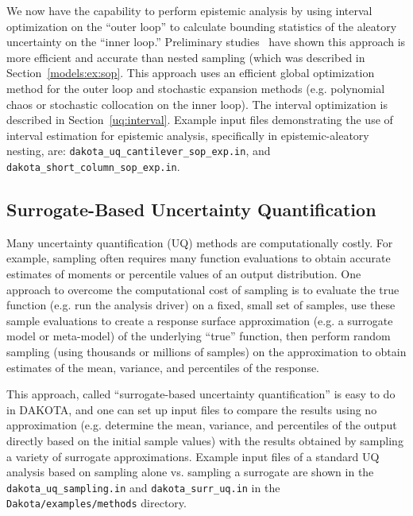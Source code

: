 We now have the capability to perform epistemic analysis by 
using interval optimization on the ``outer loop'' to calculate bounding 
statistics of the aleatory uncertainty on the ``inner loop.''  
Preliminary studies~\cite{Eldred09} have shown this approach is more efficient 
and accurate than nested sampling (which was described in 
Section~\ref{models:ex:sop}.  This approach uses 
an efficient global optimization method for the outer loop and 
stochastic expansion methods (e.g. polynomial chaos or stochastic 
collocation on the inner loop).  The interval optimization is described in 
Section~\ref{uq:interval}.  Example input files demonstrating 
the use of interval estimation for epistemic analysis, 
specifically in epistemic-aleatory nesting, are: 
\texttt{dakota\_uq\_cantilever\_sop\_exp.in}, and
\texttt{dakota\_short\_column\_sop\_exp.in}. 

\subsection{Surrogate-Based Uncertainty Quantification} \label{models:ex:sbuq}

Many uncertainty quantification (UQ) methods are computationally costly. 
For example, sampling often requires many function evaluations to obtain 
accurate estimates of moments or percentile values of an output distribution.  
One approach to overcome the computational cost of sampling is to 
evaluate the true function (e.g. run the analysis driver) on a fixed, small
set of samples, use these sample evaluations to 
create a response surface approximation (e.g. a surrogate model or meta-model)
of the underlying ``true'' function, then perform random sampling (using 
thousands or millions of samples) on the approximation to obtain estimates 
of the mean, variance, and percentiles of the response. 

This approach, called ``surrogate-based uncertainty quantification'' 
is easy to do in DAKOTA, and one can set up input files to compare the 
results using no approximation (e.g. determine the mean, variance, and 
percentiles of the output directly based on the initial sample values) 
with the results obtained by sampling a variety of surrogate approximations.  
Example input files of a standard UQ analysis based on sampling alone vs. 
sampling a surrogate are shown in the \texttt{dakota\_uq\_sampling.in} and 
\texttt{dakota\_surr\_uq.in} in the \texttt{Dakota/examples/methods}
directory. 

